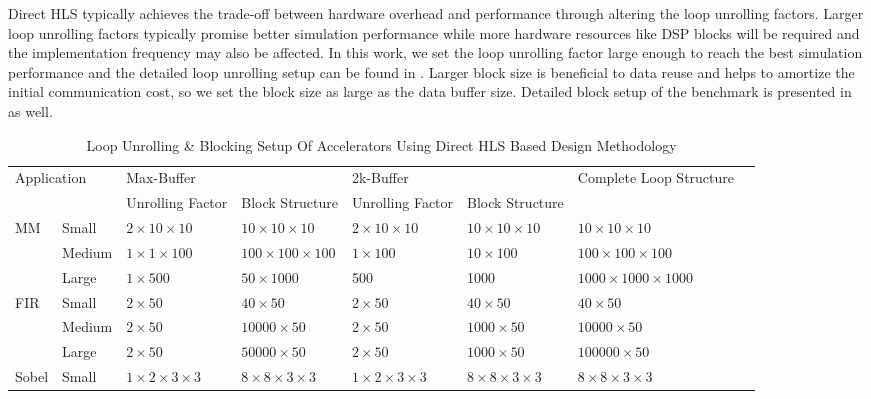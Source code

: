 Direct HLS typically achieves the trade-off between hardware overhead and performance through altering the loop unrolling factors. Larger loop unrolling factors typically promise better simulation performance while more hardware resources like DSP blocks will be required and the implementation frequency may also be affected. In this work, we set the loop unrolling factor large enough to reach the best simulation performance and the detailed loop unrolling setup can be found in . Larger block size is beneficial to data reuse and helps to amortize the initial communication cost, so we set the block size as large as the data buffer size. Detailed block setup of the benchmark is presented in  as well.

\begin{table*}[htpb]
\centering
\caption{Loop Unrolling \& Blocking Setup Of Accelerators Using Direct HLS Based Design Methodology}
\label{tab:loop-unrolling-setup-vivado}
\begin{tabular}{l|l|l|l|l|l|l|l}
\hline
\multicolumn{2}{l|}{\multirow{2}{*}{Application}} & \multicolumn{2}{l|}{Max-Buffer} & \multicolumn{2}{l|}{2k-Buffer} & \multirow{2}{*}{Complete Loop Structure} \\ \cline{3-6}
\multicolumn{2}{l|}{} & Unrolling Factor & Block Structure & Unrolling Factor & Block Structure & \\ \hline
\multirow{3}{*}{MM} & Small & $2 \times 10 \times 10$ & $10 \times 10 \times 10$ & $2 \times 10 \times 10$ & $10 \times 10 \times 10$ & $10 \times 10 \times 10$ \\ \cline{2-7} 
                    & Medium & $1 \times 1 \times 100$ & $100 \times 100 \times 100$ & $1 \times 100$ & $10 \times 100$ & $100 \times 100 \times 100$ \\ \cline{2-7} 
                    & Large & $1 \times 500$ & $50 \times 1000$ & 500 & 1000  & $1000 \times 1000 \times 1000$ \\ \hline
\multirow{3}{*}{FIR} & Small & $2 \times 50$ & $40 \times 50$ & $2 \times 50$ & $40 \times 50$ & $40 \times 50$ \\ \cline{2-7} 
                     & Medium & $2 \times 50$ & $10000 \times 50$ & $2 \times 50$ & $1000 \times 50$ & $10000 \times 50$ \\ \cline{2-7} 
                     & Large & $2 \times 50$ & $50000 \times 50$ & $2 \times 50$ & $1000 \times 50$ & $100000 \times 50$ \\ \hline
\multirow{3}{*}{Sobel} & Small & $1 \times 2 \times 3 \times 3$ & $8 \times 8 \times 3 \times 3$ & $1 \times 2 \times 3 \times 3$ & $8 \times 8 \times 3 \times 3$ & $8 \times 8 \times 3 \times 3$ \\ \cline{2-7} 

\end{tabular}
\end{table*}

